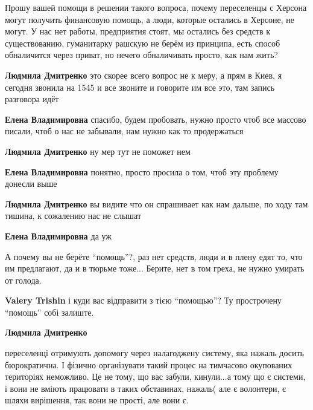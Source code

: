 \begin{itemize}

Прошу вашей помощи в решении такого вопроса, почему переселенцы с Херсона могут
получить финансовую помощь, а люди, которые остались в Херсоне, не могут. У нас
нет работы, предприятия стоят, мы остались без средств к существованию,
гуманитарку рашскую не берём из принципа, есть способ обналичится через приват,
но нечего обналичивать просто, как нам жить?

\begin{itemize} %
\textbf{Людмила Дмитренко} это скорее всего вопрос не к меру, а прям в Киев, я сегодня звонила на 1545 и все звоните и говорите им все это, там запись разговора идёт

\textbf{Елена Владимировна} спасибо, будем пробовать, нужно просто чтоб все массово писали, чтоб о нас не забывали, нам нужно как то продержаться

\textbf{Людмила Дмитренко} ну мер тут не поможет нем

\textbf{Елена Владимировна} понятно, просто просила о том, чтоб эту проблему донесли выше

\textbf{Людмила Дмитренко} вы видите что он спрашивает как нам дальше, по ходу там тишина, к сожалению нас не слышат

\textbf{Елена Владимировна} да уж


А почему вы не берёте \enquote{помощь}?, раз нет средств, люди и в плену едят то, что
им предлагают, да и в тюрьме тоже... Берите, нет в том греха, не нужно умирать
от голода.

\textbf{Valery Trishin} і куди вас відправити з тією \enquote{помощью}? Ту прострочену \enquote{помощь} собі залиште.

\textbf{Людмила Дмитренко} 

переселенці отримують допомогу через налагоджену систему, яка нажаль досить
бюрократична. І фізично організувати такий процес на тимчасово окупованих
територіях неможливо. Це не тому, що вас забули, кинули...а тому що є системи,
і вони не вміють працювати в таких обставинах, нажаль( але є волонтери, є шляхи
вирішення, так вони не прості, але вони є.

\end{itemize} %



\end{itemize}
